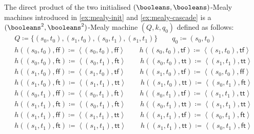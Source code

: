 \begin{example}\label{ex:mealy-direct}
    The direct product of the two initialised \((\booleans,\booleans)\)-Mealy
    machines introduced in \cref{ex:mealy-init} and \cref{ex:mealy-cascade} is
    a \((\booleans^2,\booleans^2)\)-Mealy machine \((Q,k,q_0)\) defined as
    follows:
    \begin{gather*}
        Q \coloneqq \{(s_0,t_0), (s_1,t_0), (s_0,t_1), (s_1,t_1)\}
        \qquad
        q_0 \coloneqq (s_0,t_0)
        \\
        h((s_0, t_0), \mathsf{ff})
        \coloneqq
        \left\langle(s_0, t_0), \mathsf{ff}\right\rangle
        \qquad
        h((s_0, t_0), \mathsf{tf})
        \coloneqq
        \left\langle(s_1, t_0), \mathsf{tf}\right\rangle
        \\
        h((s_0, t_0), \mathsf{ft})
        \coloneqq
        \left\langle(s_0, t_1), \mathsf{ft}\right\rangle
        \qquad
        h((s_0, t_0), \mathsf{tt})
        \coloneqq
        \left\langle(s_1, t_1), \mathsf{tt}\right\rangle
        \\
        h((s_1, t_0), \mathsf{ff})
        \coloneqq
        \left\langle(s_1, t_0), \mathsf{tf}\right\rangle
        \qquad
        h((s_1, t_0), \mathsf{tf})
        \coloneqq
        \left\langle(s_0, t_0), \mathsf{ff}\right\rangle
        \\
        h((s_1, t_0), \mathsf{ft})
        \coloneqq
        \left\langle(s_1, t_1), \mathsf{tt}\right\rangle
        \qquad
        h((s_1, t_0), \mathsf{tt})
        \coloneqq
        \left\langle(s_0, t_1), \mathsf{ft}\right\rangle
        \\
        h((s_0, t_1), \mathsf{ff})
        \coloneqq
        \left\langle(s_0, t_1), \mathsf{ft}\right\rangle
        \qquad
        h((s_0, t_1), \mathsf{tf})
        \coloneqq
        \left\langle(s_1, t_1), \mathsf{tt}\right\rangle
        \\
        h((s_1, t_1), \mathsf{ft})
        \coloneqq
        \left\langle(s_0, t_1), \mathsf{ft}\right\rangle
        \qquad
        h((s_0, t_1), \mathsf{tt})
        \coloneqq
        \left\langle(s_1, t_1), \mathsf{tt}\right\rangle
        \\
        h((s_1, t_1), \mathsf{ff})
        \coloneqq
        \left\langle(s_1, t_1), \mathsf{tt}\right\rangle
        \qquad
        h((s_1, t_1), \mathsf{tf})
        \coloneqq
        \left\langle(s_0, t_1), \mathsf{ft}\right\rangle
        \\
        h((s_1, t_1), \mathsf{ft})
        \coloneqq
        \left\langle(s_1, t_1), \mathsf{tt}\right\rangle
        \qquad
        h((s_1, t_1), \mathsf{tt})
        \coloneqq
        \left\langle(s_0, t_1), \mathsf{ft}\right\rangle
        \\
        
    \end{gather*}
\end{example}

